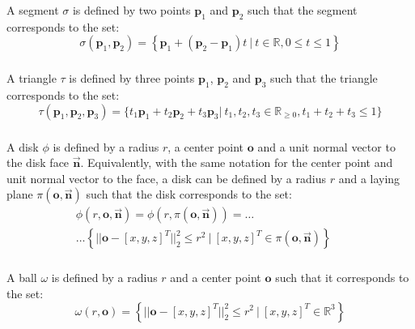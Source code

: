 \subsubsection{\Segment{}}
A segment $\sigma$ is defined by two points $\boldsymbol{p}_1$ and $\boldsymbol{p}_2$ such that the segment corresponds to the set:
%
\begin{equation*}
\sigma ( \boldsymbol{p}_1, \boldsymbol{p}_2 ) = \left\{ \boldsymbol{p}_1 + \left(\boldsymbol{p}_2-\boldsymbol{p}_1\right)t ~ \big| ~ t \in \mathbb{R},  0 \le t \le 1 \right\}
\end{equation*}

\subsubsection{\Triangle{}}
A triangle $\tau$ is defined by three points $\boldsymbol{p}_1$, $\boldsymbol{p}_2$ and $\boldsymbol{p}_3$ such that the triangle corresponds to the set:
%
\begin{equation*}
  \tau(\boldsymbol{p}_1, \boldsymbol{p}_2, \boldsymbol{p}_3) = \Big\{ t_1\boldsymbol{p}_1 + t_2\boldsymbol{p}_2 + t_3\boldsymbol{p}_3 \big| ~ t_1, t_2, t_3 \in \mathbb{R}_{\ge0}, t_1 + t_2+t_3 \le 1 \Big\}
\end{equation*}

\subsubsection{\Disk{}}
A disk $\phi$ is defined by a radius $r$, a center point $\boldsymbol{o}$ and a unit normal vector to the disk face $\vec{\boldsymbol{n}}$. Equivalently, with the same notation for the center point and unit normal vector to the face, a disk can be defined by a radius $r$ and a laying plane $\pi(\boldsymbol{o}, \vec{\boldsymbol{n}})$ such that the disk corresponds to the set:
%
\begin{equation*}
  \begin{split}
    \phi(r, \boldsymbol{o}, \vec{\boldsymbol{n}}) = \phi(r, \pi(\boldsymbol{o}, \vec{\boldsymbol{n}})) = \dots \qquad \qquad \qquad \qquad \\
    \dots \left\{ \big|\big| \boldsymbol{o} - \left[x, y, z\right]^T \big|\big|^2_2 \le r^2 ~ \big| ~\left[x, y, z\right]^T \in \pi(\boldsymbol{o}, \vec{\boldsymbol{n}}) \right\}
  \end{split}
\end{equation*}

\subsubsection{\Ball{}}
A ball $\omega$ is defined by a radius $r$ and a center point $\boldsymbol{o}$ such that it corresponds to the set:
%
\begin{equation*}
  \omega(r, \boldsymbol{o}) = \left\{ \big|\big| \boldsymbol{o} - \left[x, y, z\right]^T \big|\big|^2_2 \le r^2 ~ \big| ~\left[x, y, z\right]^T \in \mathbb{R}^3 \right\}
\end{equation*}

